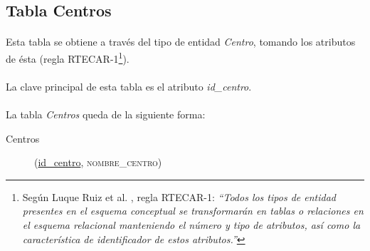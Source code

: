   \subsection{Tabla Centros}

      \paragraph{}Esta tabla se obtiene a través del tipo de entidad
      \textit{Centro}, tomando los atributos de ésta (regla
      RTECAR-1\footnote{Según Luque Ruiz et al. \cite{luqueRuiz}, regla
      RTECAR-1: \textit{``Todos los tipos de entidad presentes en el esquema
      conceptual se transformarán en tablas o relaciones en el esquema
      relacional manteniendo el número y tipo de atributos, así como la
      característica de identificador de estos atributos.''}}).

      \paragraph{}La clave principal de esta tabla es el atributo
      \textit{id\_centro}.

      \paragraph{}La tabla \textit{Centros} queda de la siguiente forma:

      \begin{description}
         \item[Centros] \begin{flushleft}(\underline{id\_centro},
         \textsc{nombre\_centro})\end{flushleft}
      \end{description}